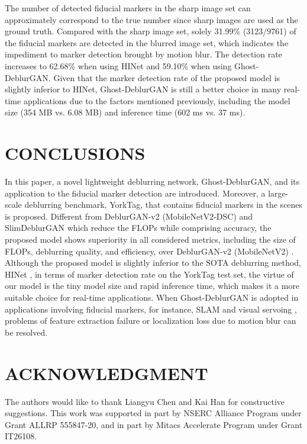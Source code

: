 \documentclass[letterpaper, 10 pt, conference]{ieeeconf}
\begin{document}
The number of detected fiducial markers in the sharp image set can approximately correspond to the true number since sharp images are used as the ground truth. Compared with the sharp image set, solely 31.99\% (3123/9761) of the fiducial markers are detected in the blurred image set, which indicates the impediment to marker detection brought by motion blur. The detection rate increases to 62.68\% when using HINet \cite{chen2021hinet} and 59.10\% when using Ghost-DeblurGAN. Given that the marker detection rate of the proposed model is slightly inferior to HINet, Ghost-DeblurGAN is still a better choice in many real-time applications due to the factors mentioned previously, including the model size (354 MB vs. 6.08 MB) and inference time (602 ms vs. 37 ms). 



\section{CONCLUSIONS}
In this paper, a novel lightweight deblurring network, Ghost-DeblurGAN, and its application to the fiducial marker detection are introduced. Moreover, a large-scale deblurring benchmark, YorkTag, that contains fiducial markers in the scenes is proposed. Different from DeblurGAN-v2 (MobileNetV2-DSC) \cite{deblurgan2} and SlimDeblurGAN \cite{truong2020slimdeblurgan} which reduce the FLOPs while comprising accuracy, the proposed model shows superiority in all considered metrics, including the size of FLOPs, deblurring quality, and efficiency, over DeblurGAN-v2 (MobileNetV2) \cite{deblurgan2}. Although the proposed model is slightly inferior to the SOTA deblurring method, HINet \cite{chen2021hinet}, in terms of marker detection rate on the YorkTag test set, the virtue of our model is the tiny model size and rapid inference time, which makes it a more suitable choice for real-time applications. When Ghost-DeblurGAN is adopted in applications involving fiducial markers, for instance, SLAM \cite{munoz,munoz2019} and visual servoing \cite{yibo}, problems of feature extraction failure or localization loss due to motion blur can be resolved.

\section*{ACKNOWLEDGMENT}
The authors would like to thank Liangyu Chen and Kai Han for constructive suggestions. This work was supported in part by NSERC Alliance Program under Grant ALLRP 555847-20, and in part by Mitacs Accelerate Program under Grant IT26108.











 
 
\end{document}
